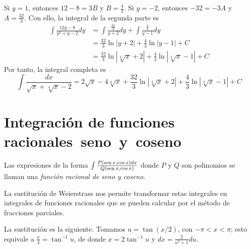 Si $y=1$, entonces $12-8=3B$ y $B=\frac{4}{3}$. Si $y=-2$, entonces $-32=-3A$ y $A=\frac{32}{3}$. Con ello, la integral de la segunda parte es
\begin{align*}
  \int \frac{12y-8}{y^{2}+y-2}dy&=\int \frac{\frac{32}{3}}{y+2}dy+\int \frac{
  \frac{4}{3}}{y-1}dy \\
  &=\frac{32}{3}\ln \left\vert y+2\right\vert +\frac{4}{3}%
  \ln \left\vert y-1\right\vert +C \\
  &=\frac{32}{3}\ln \left\vert \sqrt[4]{x}+2\right\vert +\frac{4}{3}\ln
  \left\vert \sqrt[4]{x}-1\right\vert +C
\end{align*}
Por tanto, la integral completa es
\[
  \int \frac{dx}{\sqrt{x}+\sqrt[4]{x}-2}=2\sqrt{x}-4\sqrt[4]{x}+\frac{32}{3}\ln \left\vert \sqrt[4]{x}+2\right\vert +\frac{4}{3}\ln
  \left\vert \sqrt[4]{x}-1\right\vert +C
\]

\section{Integración de funciones racionales~seno~y~coseno}

Las expresiones de la forma {\small $\int \frac{P(\operatorname{sen} x,\cos x)dx}{Q(\operatorname{sen} x,\cos x)}$} donde $P$ y $Q$ son polinomios se llaman una \emph{función racional de seno y coseno}.

La sustitución de Weierstrass nos permite transformar estas integrales en integrales de funciones racionales que se pueden calcular por el método de fracciones parciales.

La sustitución es la siguiente. Tomamos $u=\tan \left(x/2\right)$, con $-\pi<x<\pi$; esto equivale a $\frac{x}{2}=\tan^{-1} u$, de donde $x=2\tan^{-1} u$ y $dx=\frac{2}{u^{2}+1}du$.

